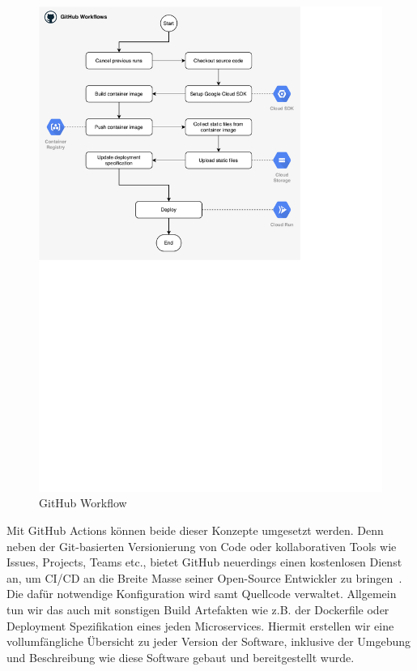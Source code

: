 \documentclass{article}
\begin{document}
\begin{figure}[H]
\centering
\includegraphics[width=\textwidth]{images/github-cicd}
\caption{GitHub Workflow}
\label{fig:github-workflow}
\end{figure}

Mit GitHub Actions können beide dieser Konzepte umgesetzt werden. Denn neben der Git-basierten Versionierung von Code oder kollaborativen Tools wie Issues, Projects, Teams etc., bietet GitHub neuerdings einen kostenlosen Dienst an, um CI/CD an die Breite Masse seiner Open-Source Entwickler zu bringen~\cite{github-actions}. Die dafür notwendige Konfiguration wird samt Quellcode verwaltet. Allgemein tun wir das auch mit sonstigen Build Artefakten wie z.B. der Dockerfile oder Deployment Spezifikation eines jeden Microservices. Hiermit erstellen wir eine vollumfängliche Übersicht zu jeder Version der Software, inklusive der Umgebung und Beschreibung wie diese Software gebaut und bereitgestellt wurde.
\end{document}
